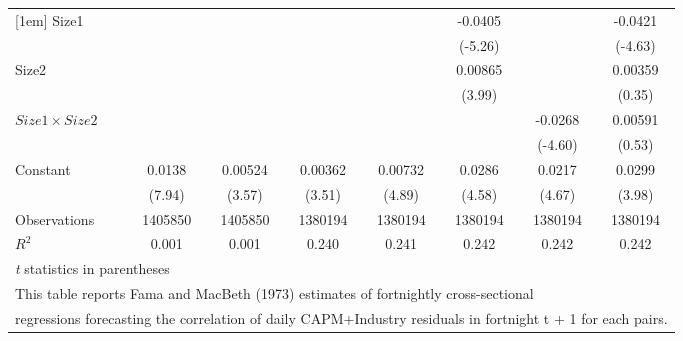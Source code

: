 {\begin{tabular}{l*{7}{c}}
[1em]
Size1               &                     &                     &                     &                     &     -0.0405\sym{***}&                     &     -0.0421\sym{***}\\
                    &                     &                     &                     &                     &     (-5.26)         &                     &     (-4.63)         \\
[1em]
Size2               &                     &                     &                     &                     &     0.00865\sym{***}&                     &     0.00359         \\
                    &                     &                     &                     &                     &      (3.99)         &                     &      (0.35)         \\
[1em]
$ Size1 \times Size2 $&                     &                     &                     &                     &                     &     -0.0268\sym{***}&     0.00591         \\
                    &                     &                     &                     &                     &                     &     (-4.60)         &      (0.53)         \\
[1em]
Constant            &      0.0138\sym{***}&     0.00524\sym{***}&     0.00362\sym{***}&     0.00732\sym{***}&      0.0286\sym{***}&      0.0217\sym{***}&      0.0299\sym{***}\\
                    &      (7.94)         &      (3.57)         &      (3.51)         &      (4.89)         &      (4.58)         &      (4.67)         &      (3.98)         \\
\hline
Observations        &     1405850         &     1405850         &     1380194         &     1380194         &     1380194         &     1380194         &     1380194         \\
\(R^{2}\)           &       0.001         &       0.001         &       0.240         &       0.241         &       0.242         &       0.242         &       0.242         \\
\hline\hline
\multicolumn{8}{l}{\footnotesize \textit{t} statistics in parentheses}\\
\multicolumn{8}{l}{\footnotesize This table reports Fama and MacBeth (1973) estimates of fortnightly cross-sectional}\\
\multicolumn{8}{l}{\footnotesize  regressions forecasting the correlation of daily CAPM+Industry residuals in fortnight t + 1 for each pairs.}\\

\end{tabular}}
